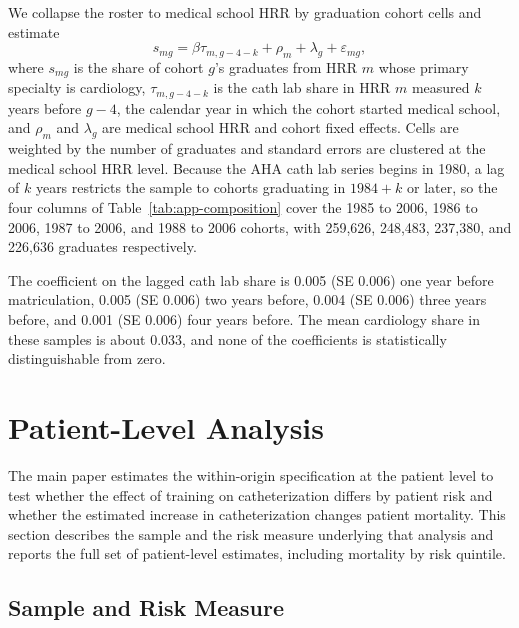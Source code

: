 \documentclass[12pt]{article}
\begin{document}
We collapse the roster to medical school HRR by graduation cohort cells and estimate
$$ s_{mg} = \beta \tau_{m,g-4-k} + \rho_m + \lambda_g + \varepsilon_{mg}, $$
where $s_{mg}$ is the share of cohort $g$'s graduates from HRR $m$ whose primary specialty is cardiology, $\tau_{m,g-4-k}$ is the cath lab share in HRR $m$ measured $k$ years before $g-4$, the calendar year in which the cohort started medical school, and $\rho_m$ and $\lambda_g$ are medical school HRR and cohort fixed effects. Cells are weighted by the number of graduates and standard errors are clustered at the medical school HRR level. Because the AHA cath lab series begins in 1980, a lag of $k$ years restricts the sample to cohorts graduating in $1984+k$ or later, so the four columns of Table~\ref{tab:app-composition} cover the 1985 to 2006, 1986 to 2006, 1987 to 2006, and 1988 to 2006 cohorts, with 259,626, 248,483, 237,380, and 226,636 graduates respectively.

The coefficient on the lagged cath lab share is 0.005 (SE 0.006) one year before matriculation, 0.005 (SE 0.006) two years before, 0.004 (SE 0.006) three years before, and 0.001 (SE 0.006) four years before. The mean cardiology share in these samples is about 0.033, and none of the coefficients is statistically distinguishable from zero.

\section{Patient-Level Analysis}\label{sec:app-patient}

The main paper estimates the within-origin specification at the patient level to test whether the effect of training on catheterization differs by patient risk and whether the estimated increase in catheterization changes patient mortality. This section describes the sample and the risk measure underlying that analysis and reports the full set of patient-level estimates, including mortality by risk quintile.

\subsection{Sample and Risk Measure}
\end{document}
